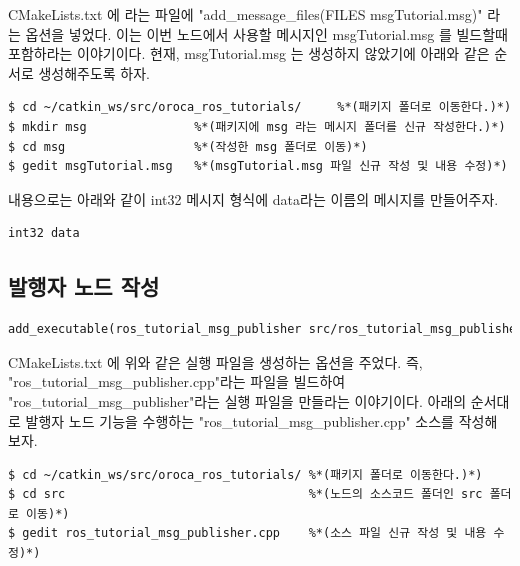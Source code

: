 CMakeLists.txt 에 라는 파일에 "add\_message\_files(FILES msgTutorial.msg)" 라는 옵션을 넣었다. 이는 이번 노드에서 사용할 메시지인 msgTutorial.msg 를 빌드할때 포함하라는 이야기이다. 현재, msgTutorial.msg 는 생성하지 않았기에 아래와 같은 순서로 생성해주도록 하자.

\begin{lstlisting}[language=ROS]
$ cd ~/catkin_ws/src/oroca_ros_tutorials/     %*(패키지 폴더로 이동한다.)*)
$ mkdir msg               %*(패키지에 msg 라는 메시지 폴더를 신규 작성한다.)*)
$ cd msg                  %*(작성한 msg 폴더로 이동)*)
$ gedit msgTutorial.msg   %*(msgTutorial.msg 파일 신규 작성 및 내용 수정)*)
\end{lstlisting}

내용으로는 아래와 같이 int32 메시지 형식에 data라는 이름의 메시지를 만들어주자.

\begin{lstlisting}[language=ROS]
int32 data
\end{lstlisting}

\subsection{발행자 노드 작성}

\begin{lstlisting}[language=make]
add_executable(ros_tutorial_msg_publisher src/ros_tutorial_msg_publisher.cpp)
\end{lstlisting}

CMakeLists.txt 에 위와 같은 실행 파일을 생성하는 옵션을 주었다. 즉, "ros\_tutorial\_msg\_publisher.cpp"라는 파일을 빌드하여 "ros\_tutorial\_msg\_publisher"라는 실행 파일을 만들라는 이야기이다. 아래의 순서대로 발행자 노드 기능을 수행하는 "ros\_tutorial\_msg\_publisher.cpp" 소스를 작성해 보자. 

\begin{lstlisting}[language=ROS]
$ cd ~/catkin_ws/src/oroca_ros_tutorials/ %*(패키지 폴더로 이동한다.)*)
$ cd src                                  %*(노드의 소스코드 폴더인 src 폴더로 이동)*)
$ gedit ros_tutorial_msg_publisher.cpp    %*(소스 파일 신규 작성 및 내용 수정)*)
\end{lstlisting}

